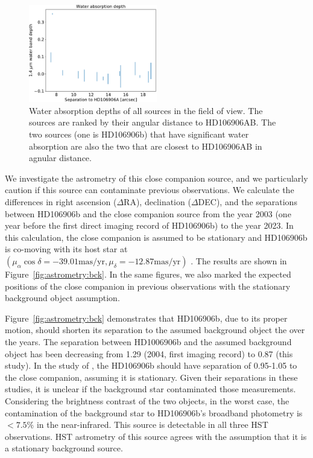 \documentclass[twocolumn]{aastex62}
\begin{document}
\begin{figure}
  \centering
  \includegraphics[width=0.5\textwidth]{figures/bck_waterdepth.pdf}
  \caption{Water absorption depths of all sources in the field of view. The sources are ranked by their angular distance to HD106906AB. The two sources (one is HD106906b) that have significant water absorption are also the two that are closest to HD106906AB in agnular distance.}
  \label{fig:backgroundsources}
\end{figure}

We investigate the astrometry of this close companion source, and we particularly caution if this source can contaminate previous observations.  We calculate the differences in right ascension ($\Delta$RA),  declination ($\Delta$DEC), and the separations between HD106906b and the close companion source from the year 2003 (one year before the first direct imaging record of HD106906b) to the year 2023. In this calculation, the close companion is assumed to be stationary and HD106906b is co-moving with its host star at $(\mu_\alpha\cos\delta=-39.01 \mbox{mas/yr}, \mu_{\delta}=-12.87 \mbox{mas/yr})$ \citep{Gaia2016, Gaia2018}. The results are shown in Figure~\ref{fig:astrometry:bck}. In the same figures, we also marked the expected positions of the close companion in previous observations \citep{Bailey2013, Wu2016, Lagrange2016, Daemgen2017} with the stationary background object assumption.

Figure~\ref{fig:astrometry:bck} demonstrates that HD106906b, due to its proper motion, should shorten its separation to the assumed background object the  over the years. The separation between HD1006906b and the assumed background object has been decreasing from 1\arcsec.29 (2004, first imaging record) to 0\arcsec.87 (this study). In the study of \citep{Bailey2013, Wu2016, Daemgen2017}, the HD106906b should have separation of 0.95-1.05 to the close companion, assuming it is stationary. Given their separations in these studies, it is unclear if the background star contaminated those measurements. Considering the brightness contrast of the two objects, in the worst case, the contamination of the background star to HD106906b's broadband photometry is  $<7.5\%$ in the near-infrared. This source is detectable in all three HST observations. HST astrometry of this source agrees with the assumption that it is a stationary background source.
\end{document}
